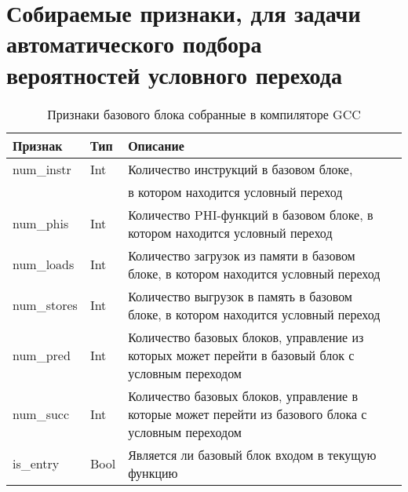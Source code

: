 \chapter{Собираемые признаки, для задачи автоматического подбора вероятностей условного перехода} \label{app:A}
\begin{table} [htbp]
	\centering
	\begin{threeparttable}%
		\caption{Признаки базового блока собранные в компиляторе GCC}\label{op:pgo_geatures1}%
		\begin{tabular}{| m{3cm} | m{1cm} |  m{9cm}l |}
			\hline
			\hline
			\centering \textbf{Признак}			 & \centering  \textbf{Тип} &  \centering  \textbf{Описание} & \\
			\hline
			\centering num\_instr			 & \centering  Int & Количество инструкций в базовом блоке, & \\
			&                 & в котором находится условный переход & \\
			\hline
			\centering num\_phis			 & \centering  Int &    Количество PHI-функций в базовом блоке, в котором находится условный переход & \\
			\hline
			\centering num\_loads			 & \centering  Int &    Количество загрузок из памяти в базовом блоке, в котором находится условный переход & \\
			\hline
			\centering num\_stores			 & \centering  Int &    Количество выгрузок в память в базовом блоке, в котором находится условный переход & \\
			\hline
			\centering num\_pred			 & \centering  Int &    Количество базовых блоков, управление из которых может перейти в базовый блок с условным переходом & \\
			\hline
			\centering num\_succ			 & \centering  Int &    Количество базовых блоков, управление в которые может перейти из базового блока с условным переходом & \\
			\hline
			\centering is\_entry			 & \centering  Bool &   Является ли базовый блок входом в текущую  функцию & \\
			\hline
			\hline
		\end{tabular}
	\end{threeparttable}
\end{table}

